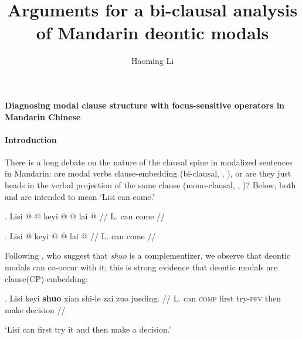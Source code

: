 \documentclass[11pt]{article}
\title{Arguments for a bi-clausal analysis of Mandarin deontic modals}
\author{Haoming Li}
\let\latextextsubscript\textsubscript
\let\textsubscript\latextextsubscript
\newcommand{\gap}[1]{\rule{1em}{0.4pt}\textsubscript{#1}}
\begin{document}
\strut \hfill \textbf{Diagnosing modal clause structure with focus-sensitive operators in Mandarin Chinese} \hfill  \strut

\paragraph{Introduction}
\label{sec:introduction}

There is a long debate on the nature of the clausal spine in modalized sentences in Mandarin: 
are modal verbs clause-embedding (bi-clausal, \Next, \citealt{linFinitenessClausesRaising2011,linMultiplemodalConstructionsMandarin2012,zhangSentencefinalAspectParticles2019}), or are they just heads in the verbal projection of the same clause (mono-clausal, \NNext, \citealt{tsaiTopographyChineseModals2015,yipModalMovementLicensed2022,erlewineLowSentencefinalParticles2017})?
Below, both \Next and \NNext are intended to mean `Lisi can come.'
\begin{paracol}{2}
\ex. \begingl
\gla Lisi \nogloss{\I{[}VP {} } @  \nogloss{\I{[}V {} } @ keyi @ \nogloss{]} \nogloss{\I{[}TP/CP {} } @ \nogloss{\gap{}} lai @ \nogloss{]]} //
  \glb L. can come //
\endgl

\switchcolumn
\ex.  \begingl
\gla Lisi \nogloss{\I{[}F/ModP \I{[}F/Mod {} } @ keyi @ \nogloss{]} \nogloss{\I{[}\emph{v}P {} } @ \nogloss{\gap{}} lai @ \nogloss{]]} //
  \glb L. can come //
\endgl

\end{paracol}

Following \citet{chappellVariationGrammaticalizationComplementizers2008,huangControlComplementsMandarin2018a}, who suggest that \emph{shuo} is a complementizer, we observe that deontic modals can co-occur with it; this is strong evidence that deontic modals are clause(CP)-embedding:
\begin{paracol}{2}
\ex. \begingl
  \gla Lisi keyi \textbf{shuo} xian shi-le zai zuo jueding. //
  \glb L. can \textsc{comp} first try-\textsc{pfv} then make decision //
\endgl

  \switchcolumn
   `Lisi can first try it and then make a decision.' 
\end{paracol}
\end{document}
